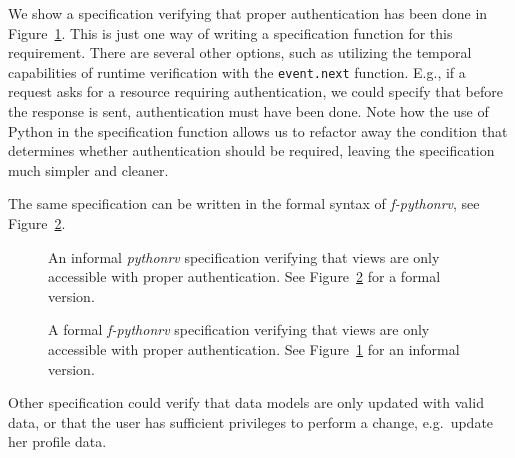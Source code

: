 We show a specification verifying that proper authentication has been done in
Figure~\ref{figure-app-authentication-informal}. This is just one way of
writing a specification function for this requirement. There are several other
options, such as utilizing the temporal capabilities of runtime verification
with the \texttt{event.next} function. E.g., if a request asks for a resource
requiring authentication, we could specify that before the response is sent,
authentication must have been done. Note how the use of Python in the
specification function allows us to refactor away the condition that determines
whether authentication should be required, leaving the specification much
simpler and cleaner.

The same specification can be written in the formal syntax of
\textit{f-pythonrv}, see Figure~\ref{figure-app-authentication-formal}.

\begin{figure}[h!]
	\begin{center}
	\begin{minipage}{0.9\textwidth}
	
	\end{minipage}
	\end{center}

  \caption{An informal \textit{pythonrv} specification verifying that views are
    only accessible with proper authentication. See
    Figure~\ref{figure-app-authentication-formal} for a formal version.}
	\label{figure-app-authentication-informal}
\end{figure}

\begin{figure}[h!]
	\begin{center}
	\begin{minipage}{0.9\textwidth}
	
	\end{minipage}
	\end{center}

  \caption{A formal \textit{f-pythonrv} specification verifying that views are
    only accessible with proper authentication. See
    Figure~\ref{figure-app-authentication-informal} for an informal version.}
	\label{figure-app-authentication-formal}
\end{figure}

Other specification could verify that data models are only updated with valid
data, or that the user has sufficient privileges to perform a change, e.g.\
update her profile data.

